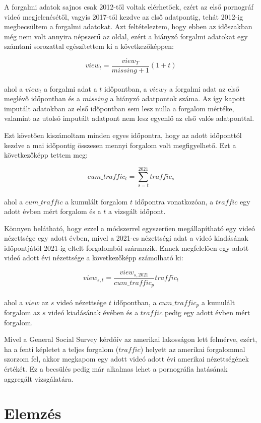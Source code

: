 \documentclass[12pt,a4paper]{article}
\begin{document}
A forgalmi adatok sajnos csak 2012-től voltak elérhetőek, ezért az első pornográf videó megjelenésétől, vagyis 2017-től kezdve az első adatpontig, tehát 2012-ig megbecsültem a forgalmi adatokat. Azt feltételeztem, hogy ebben az időszakban még nem volt annyira népszerű az oldal, ezért a hiányzó forgalmi adatokat egy számtani sorozattal egészítettem ki a következőképpen:

$$view_t = \frac{view_T}{missing + 1} (1 + t)$$
\\
\noindent ahol a $view_t$ a forgalmi adat a $t$ időpontban, a $view_T$ a forgalmi adat az első meglévő időpontban és a $missing$ a hiányzó adatpontok száma. Az így kapott imputált adatokban az első időpontban sem lesz nulla a forgalom mértéke, valamint az utolsó imputált adatpont nem lesz egyenlő az első valós adatponttal.

Ezt követően kiszámoltam minden egyes időpontra, hogy az adott időponttól kezdve a mai időpontig összesen mennyi forgalom volt megfigyelhető. Ezt a következőképp tettem meg:

$$cum\_traffic_t = \sum_{s = t}^{2021} traffic_s$$
\\
\noindent ahol a $cum\_traffic$ a kumulált forgalom $t$ időpontra vonatkozóan, a $traffic$ egy adott évben mért forgalom és a $t$ a vizsgált időpont.

Könnyen belátható, hogy ezzel a módszerrel egyszerűen megállapítható egy videó nézettsége egy adott évben, mivel a 2021-es nézettségi adat a videó kiadásának időpontjától 2021-ig eltelt forgalomból származik. Ennek megfelelően egy adott videó adott évi nézettsége a következőképp számolható ki:

$$view_{s,t} = \frac{view_{s, 2021}}{cum\_traffic_p} traffic_t$$
\\
ahol a $view$ az $s$ videó nézettsége $t$ időpontban, a $cum\_traffic_p$ a kumulált forgalom az $s$ videó kiadásának évében és a $traffic$ pedig egy adott évben mért forgalom.

Mivel a General Social Survey kérdőív az amerikai lakosságon lett felmérve, ezért, ha a fenti képletet a teljes forgalom ($traffic$) helyett az amerikai forgalommal szorzom fel, akkor megkapom egy adott videó adott évi amerikai nézettségének értékét. Ez a becsülés pedig már alkalmas lehet a pornográfia hatásának aggregált vizsgálatára.

\section{Elemzés}
\end{document}
